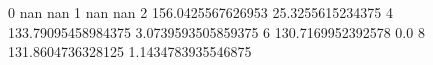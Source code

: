 0 nan nan
1 nan nan
2 156.0425567626953 25.3255615234375
4 133.79095458984375 3.0739593505859375
6 130.7169952392578 0.0
8 131.8604736328125 1.1434783935546875
